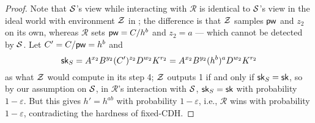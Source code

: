 \begin{proof}
	Note that $\mathcal{S}$'s view while interacting with $\mathcal{R}$ is identical to $\mathcal{S}$'s view in the ideal world with environment $\mathcal{Z}$ in ; the difference is that $\mathcal{Z}$ samples $\mathsf{pw}$ and $z_2$ on its own, whereas $\mathcal{R}$ sets $\mathsf{pw} = C/h^b$ and $z_2 = a$ --- which cannot be detected by $\mathcal{S}$. Let $C' = C/\mathsf{pw} = h^b$ and
	$$\mathsf{sk}_S = A^{x_2}B^{y_2}(C')^{z_2}D^{w_2}K^{r_2}=A^{x_2}B^{y_2}(h^b)^{a}D^{w_2}K^{r_2}$$
	as what $\mathcal{Z}$ would compute in its step 4; $\mathcal{Z}$ outputs 1 if and only if $\mathsf{sk}_S = \mathsf{sk}$, so by our assumption on $\mathcal{S}$, in $\mathcal{R}$'s interaction with $\mathcal{S}$, $\mathsf{sk}_S = \mathsf{sk}$ with probability $1-\varepsilon$. But this gives $h' = h^{ab}$ with probability $1-\varepsilon$, i.e., $\mathcal{R}$ wins with probability $1-\varepsilon$, contradicting the hardness of fixed-CDH.
\end{proof}
